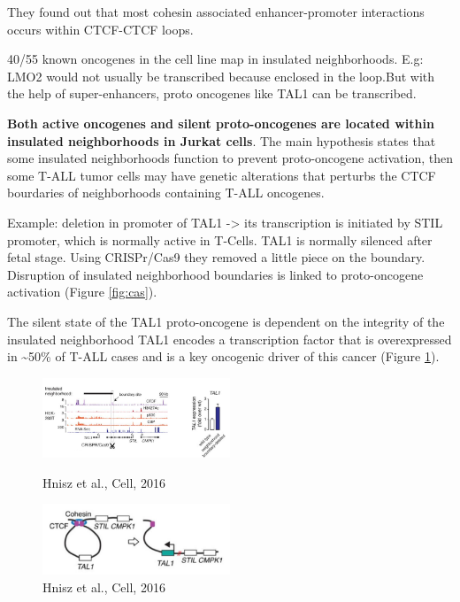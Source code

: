 They found out that most cohesin associated enhancer-promoter interactions occurs within CTCF-CTCF loops.

40/55 known oncogenes in the cell line map in insulated neighborhoods. E.g: LMO2 would not usually be transcribed because enclosed in the loop.But with the help of super-enhancers, proto oncogenes like TAL1 can be transcribed.

\textbf{Both active oncogenes and silent proto-oncogenes are located within insulated neighborhoods in Jurkat cells}. 
The main hypothesis states that some insulated neighborhoods function to prevent proto-oncogene activation, then some T-ALL tumor cells may have genetic alterations that perturbs the CTCF bourdaries of neighborhoods containing T-ALL oncogenes.

Example: deletion in promoter of TAL1 -\textgreater{} its transcription is initiated by STIL promoter, which is normally active in T-Cells. TAL1 is normally silenced after fetal stage. Using CRISPr/Cas9 they removed a little piece on the boundary. Disruption of insulated neighborhood boundaries is linked to proto-oncogene activation (Figure \ref{fig:cas}).

The silent state of the TAL1 proto-oncogene is dependent on the integrity of the insulated neighborhood TAL1 encodes a transcription factor that is overexpressed in \textasciitilde50\% of T-ALL cases and is a key oncogenic driver of this cancer (Figure \ref{fig:tal1}).

\begin{figure}[!htb]
   \begin{minipage}{0.48\textwidth}
     \centering
    \includegraphics[width=0.5\textwidth]{../_resources/bf32b9679af0fb7fcba57b9f87bb4207.png}
\caption{Hnisz et al., Cell, 2016}
\label{fig:cas}
   \end{minipage}\hfill
   \begin{minipage}{0.48\textwidth}
     \centering
    \includegraphics[width=0.5\textwidth]{../_resources/3d83d920d425aa5f76bdbb127596c02b.png}
\caption{Hnisz et al., Cell, 2016}\label{fig:tal1}
   \end{minipage}
\end{figure}

